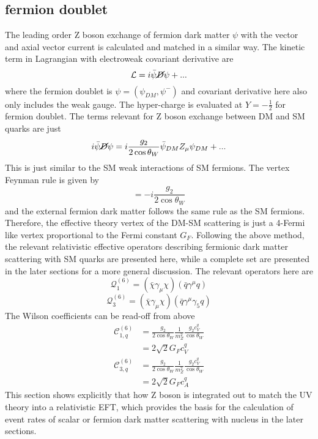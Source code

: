 \documentclass[12pt]{article}
\begin{document}
\subsection{fermion doublet}
The leading order Z boson exchange of fermion dark matter $\psi$ with the vector and axial vector current is calculated and matched in a similar way. The kinetic term in Lagrangian with electroweak covariant derivative are
$$
\mathcal L = i \bar \psi \cancel D \psi + ...
$$
where the fermion doublet is $\psi = ( \psi_{DM} , \psi^-)$ and covariant derivative here also only includes the weak gauge.  The hyper-charge is evaluated at $Y=-\frac{1}{2} $ for fermion doublet. The terms relevant for Z boson exchange between DM and SM quarks are just 
$$
i  \bar \psi \cancel D \psi  = i \frac{g_2}{2\cos \theta_W}  \bar \psi_{DM} Z_\mu \psi_{DM} + ...
$$
This is just similar to the SM weak interactions of SM fermions. The vertex Feynman rule is given by
$$
= - i\frac{ g_2 }{2 \cos \theta_W}  
$$
and the external fermion dark matter follows the same rule as the SM fermions. 
Therefore, the effective theory vertex of the DM-SM scattering is just a 4-Fermi like vertex proportional to the Fermi constant $G_F$. Following the above method, the relevant relativistic effective operators describing fermionic dark matter scattering with SM quarks are presented here, while a complete set are presented in the later sections for a more general discussion. The relevant operators here are
$$
  \mathcal Q_1^{(6)} = (\bar \chi \gamma_\mu \chi ) (\bar q \gamma^\mu q)
$$
$$
  \mathcal Q_3^{(6)} = (\bar \chi \gamma_\mu \chi ) (\bar q \gamma^\mu \gamma_5 q)
$$
The Wilson coefficients can be read-off from above
\begin{equation}
\begin{aligned}
\mathcal C_{1,q}^{(6)}
&
= \frac{g_2}{2 \cos \theta_W } \frac{1}{m_Z^2} \frac{g_2 c_V^q}{\cos \theta_W}\\
& = 2\sqrt 2 G_F c_V^q
\end{aligned}
\end{equation}
\begin{equation}
\begin{aligned}
\mathcal C_{3,q}^{(6)}
&
= \frac{g_2}{2 \cos \theta_W } \frac{1}{m_Z^2} \frac{g_2 c_V^q}{\cos \theta_W}\\
& = 2\sqrt 2 G_F c_A^q
\end{aligned}
\end{equation}
This section shows explicitly that how Z boson is integrated out to match the UV theory into a relativistic EFT, which provides the basis for the calculation of event rates of scalar or fermion dark matter scattering with nucleus in the later sections. 
\end{document}
